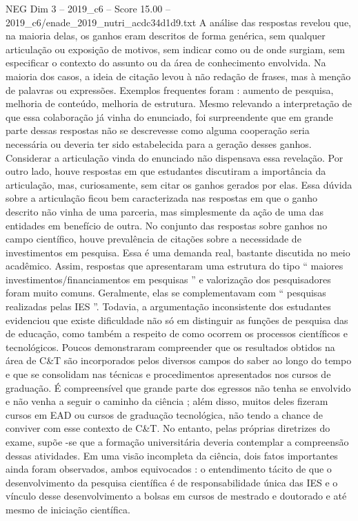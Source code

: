 \begin{textsample}{NEG Dim 3 – 2019\_c6 – Score 15.00 – 2019\_c6/enade\_2019\_nutri\_acdc34d1d9.txt}
A análise das respostas revelou que, na maioria delas, os ganhos eram descritos de forma genérica, sem qualquer articulação ou exposição de motivos, sem indicar como ou de onde surgiam, sem especificar o contexto do assunto ou da área de conhecimento envolvida.
Na maioria dos casos, a ideia de citação levou à não redação de frases, mas à menção de palavras ou expressões.
Exemplos frequentes foram : aumento de pesquisa, melhoria de conteúdo, melhoria de estrutura.
Mesmo relevando a interpretação de que essa colaboração já vinha do enunciado, foi surpreendente que em grande parte dessas respostas não se descrevesse como alguma cooperação seria necessária ou deveria ter sido estabelecida para a geração desses ganhos.
Considerar a articulação vinda do enunciado não dispensava essa revelação.
Por outro lado, houve respostas em que estudantes discutiram a importância da articulação, mas, curiosamente, sem citar os ganhos gerados por elas.
Essa dúvida sobre a articulação ficou bem caracterizada nas respostas em que o ganho descrito não vinha de uma parceria, mas simplesmente da ação de uma das entidades em benefício de outra.
No conjunto das respostas sobre ganhos no campo científico, houve prevalência de citações sobre a necessidade de investimentos em pesquisa.
Essa é uma demanda real, bastante discutida no meio acadêmico.
Assim, respostas que apresentaram uma estrutura do tipo “ maiores investimentos/financiamentos em pesquisas ” e valorização dos pesquisadores foram muito comuns.
Geralmente, elas se complementavam com “ pesquisas realizadas pelas IES ”.
Todavia, a argumentação inconsistente dos estudantes evidenciou que existe dificuldade não só em distinguir as funções de pesquisa das de educação, como também a respeito de como ocorrem os processos científicos e tecnológicos.
Poucos demonstraram compreender que os resultados obtidos na área de C\&T são incorporados pelos diversos campos do saber ao longo do tempo e que se consolidam nas técnicas e procedimentos apresentados nos cursos de graduação.
É compreensível que grande parte dos egressos não tenha se envolvido e não venha a seguir o caminho da ciência ; além disso, muitos deles fizeram cursos em EAD ou cursos de graduação tecnológica, não tendo a chance de conviver com esse contexto de C\&T.
No entanto, pelas próprias diretrizes do exame, supõe -se que a formação universitária deveria contemplar a compreensão dessas atividades.
Em uma visão incompleta da ciência, dois fatos importantes ainda foram observados, ambos equivocados : o entendimento tácito de que o desenvolvimento da pesquisa científica é de responsabilidade única das IES e o vínculo desse desenvolvimento a bolsas em cursos de mestrado e doutorado e até mesmo de iniciação científica.

\end{textsample}
